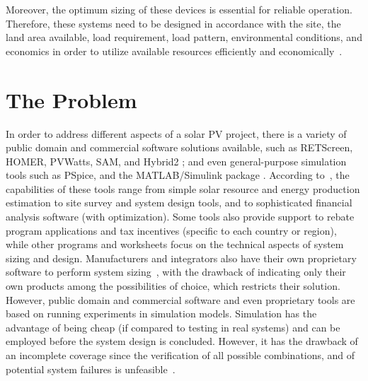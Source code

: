 Moreover, the optimum sizing of these devices is essential for reliable operation. Therefore, these systems need to be designed in accordance with the site, the land area available, load requirement, load pattern, environmental conditions, and economics in order to utilize available resources efficiently and economically~\cite{Rawat}.

\section{The Problem}

In order to address different aspects of a solar PV project, there is a variety of public domain and commercial software solutions  available, such as RETScreen, HOMER, PVWatts, SAM, and Hybrid2 \cite{Pradhan,Swarnkar,NRELDobos,NRELBlair,Mills}; and even general-purpose simulation tools such as PSpice, and the MATLAB/Simulink package \cite{Gow1999,Benatiallah2017}. According to~\cite{Brooks}, the capabilities of these tools range from simple solar resource and energy production estimation to site survey and system design tools, and to sophisticated financial analysis software (with optimization). Some tools also provide support to rebate program applications and tax incentives (specific to each country or region), while other programs and worksheets focus on the technical aspects of system sizing and design.  
%
Manufacturers and integrators also have their own proprietary software to perform system sizing~\cite{Zhou2010}, with the drawback of indicating only their own products among the possibilities of choice, which restricts their solution. 
%
However, public domain and commercial software and even proprietary tools are based on running experiments in simulation models. Simulation has the advantage of being cheap (if compared to testing in real systems) and can be employed before the system design is concluded. However, it has the drawback of an incomplete coverage since the verification of all possible combinations, and of potential system failures is unfeasible~\cite{ClarkeHV18}.

